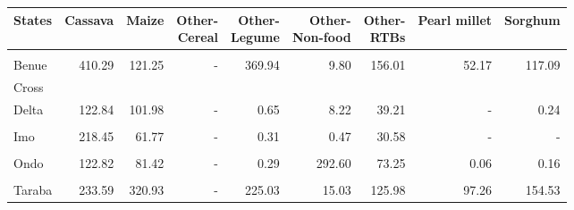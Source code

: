 \begin{table}[!h]
\centering\begingroup\fontsize{7}{9}\selectfont

\begin{tabular}{>{\raggedright\arraybackslash}p{1.8cm}rrrrrrrr}
\toprule
States & Cassava & Maize & \makecell{Other-\\Cereal} & \makecell{Other-\\Legume} & \makecell{Other-\\Non-food} & \makecell{Other-\\RTBs} & Pearl millet & Sorghum\\
\midrule
\cellcolor{gray!10}{Akwa Ibom} & \cellcolor{gray!10}{165.38} & \cellcolor{gray!10}{45.68} & \cellcolor{gray!10}{-} & \cellcolor{gray!10}{0.16} & \cellcolor{gray!10}{0.80} & \cellcolor{gray!10}{17.38} & \cellcolor{gray!10}{-} & \cellcolor{gray!10}{-}\\
Benue & 410.29 & 121.25 & - & 369.94 & 9.80 & 156.01 & 52.17 & 117.09\\
Cross
\cellcolor{gray!10}{River} & \cellcolor{gray!10}{350.57} & \cellcolor{gray!10}{91.95} & \cellcolor{gray!10}{-} & \cellcolor{gray!10}{7.53} & \cellcolor{gray!10}{307.53} & \cellcolor{gray!10}{79.02} & \cellcolor{gray!10}{0.96} & \cellcolor{gray!10}{2.24}\\
Delta & 122.84 & 101.98 & - & 0.65 & 8.22 & 39.21 & - & 0.24\\
\cellcolor{gray!10}{Enugu} & \cellcolor{gray!10}{253.22} & \cellcolor{gray!10}{62.96} & \cellcolor{gray!10}{-} & \cellcolor{gray!10}{5.92} & \cellcolor{gray!10}{0.03} & \cellcolor{gray!10}{160.64} & \cellcolor{gray!10}{0.27} & \cellcolor{gray!10}{0.77}\\
\addlinespace
Imo & 218.45 & 61.77 & - & 0.31 & 0.47 & 30.58 & - & -\\
\cellcolor{gray!10}{Kaduna} & \cellcolor{gray!10}{238.46} & \cellcolor{gray!10}{444.82} & \cellcolor{gray!10}{0.18} & \cellcolor{gray!10}{551.92} & \cellcolor{gray!10}{27.08} & \cellcolor{gray!10}{118.56} & \cellcolor{gray!10}{387.41} & \cellcolor{gray!10}{344.25}\\
Ondo & 122.82 & 81.42 & - & 0.29 & 292.60 & 73.25 & 0.06 & 0.16\\
\cellcolor{gray!10}{Osun} & \cellcolor{gray!10}{69.64} & \cellcolor{gray!10}{80.31} & \cellcolor{gray!10}{-} & \cellcolor{gray!10}{1.04} & \cellcolor{gray!10}{233.53} & \cellcolor{gray!10}{12.15} & \cellcolor{gray!10}{0.04} & \cellcolor{gray!10}{0.50}\\
Taraba & 233.59 & 320.93 & - & 225.03 & 15.03 & 125.98 & 97.26 & 154.53\\
\bottomrule
\end{tabular}
\endgroup{}
\end{table}
